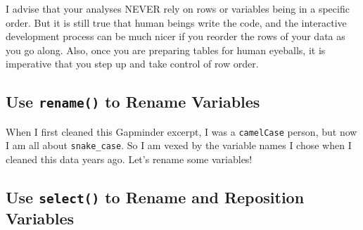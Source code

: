 \documentclass[
]{book}
\newenvironment{Shaded}{\begin{snugshade}}{\end{snugshade}}
\newcommand{\CommentTok}[1]{\textcolor[rgb]{0.56,0.35,0.01}{\textit{#1}}}
\newcommand{\DataTypeTok}[1]{\textcolor[rgb]{0.13,0.29,0.53}{#1}}
\newcommand{\KeywordTok}[1]{\textcolor[rgb]{0.13,0.29,0.53}{\textbf{#1}}}
\newcommand{\NormalTok}[1]{#1}
\newcommand{\OperatorTok}[1]{\textcolor[rgb]{0.81,0.36,0.00}{\textbf{#1}}}
\newcommand{\StringTok}[1]{\textcolor[rgb]{0.31,0.60,0.02}{#1}}
\begin{document}
I advise that your analyses NEVER rely on rows or variables being in a specific order. But it is still true that human beings write the code, and the interactive development process can be much nicer if you reorder the rows of your data as you go along. Also, once you are preparing tables for human eyeballs, it is imperative that you step up and take control of row order.

\hypertarget{use-rename-to-rename-variables}{%
\subsection{\texorpdfstring{Use \texttt{rename()} to Rename Variables}{Use rename() to Rename Variables}}\label{use-rename-to-rename-variables}}

When I first cleaned this Gapminder excerpt, I was a \texttt{camelCase} person, but now I am all about \texttt{snake\_case}. So I am vexed by the variable names I chose when I cleaned this data years ago. Let's rename some variables!

\begin{Shaded}
\end{Shaded}

\hypertarget{use-select-to-rename-and-reposition-variables}{%
\subsection{\texorpdfstring{Use \texttt{select()} to Rename and Reposition Variables}{Use select() to Rename and Reposition Variables}}\label{use-select-to-rename-and-reposition-variables}}
\end{document}
